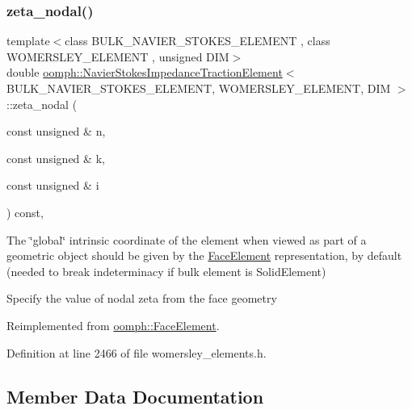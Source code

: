 \subsubsection{\texorpdfstring{zeta\+\_\+nodal()}{zeta\_nodal()}}
{\footnotesize\ttfamily template$<$class B\+U\+L\+K\+\_\+\+N\+A\+V\+I\+E\+R\+\_\+\+S\+T\+O\+K\+E\+S\+\_\+\+E\+L\+E\+M\+E\+NT , class W\+O\+M\+E\+R\+S\+L\+E\+Y\+\_\+\+E\+L\+E\+M\+E\+NT , unsigned D\+IM$>$ \\
double \hyperlink{classoomph_1_1NavierStokesImpedanceTractionElement}{oomph\+::\+Navier\+Stokes\+Impedance\+Traction\+Element}$<$ B\+U\+L\+K\+\_\+\+N\+A\+V\+I\+E\+R\+\_\+\+S\+T\+O\+K\+E\+S\+\_\+\+E\+L\+E\+M\+E\+NT, W\+O\+M\+E\+R\+S\+L\+E\+Y\+\_\+\+E\+L\+E\+M\+E\+NT, D\+IM $>$\+::zeta\+\_\+nodal (\begin{DoxyParamCaption}\item[{const unsigned \&}]{n,  }\item[{const unsigned \&}]{k,  }\item[{const unsigned \&}]{i }\end{DoxyParamCaption}) const\hspace{0.3cm}{\ttfamily [inline]}, {\ttfamily [virtual]}}



The \char`\"{}global\char`\"{} intrinsic coordinate of the element when viewed as part of a geometric object should be given by the \hyperlink{classoomph_1_1FaceElement}{Face\+Element} representation, by default (needed to break indeterminacy if bulk element is Solid\+Element) 

Specify the value of nodal zeta from the face geometry 

Reimplemented from \hyperlink{classoomph_1_1FaceElement_a58c9f93705c7741f76c8487d152e68a6}{oomph\+::\+Face\+Element}.



Definition at line 2466 of file womersley\+\_\+elements.\+h.



\subsection{Member Data Documentation}
\mbox{\label{classoomph_1_1NavierStokesImpedanceTractionElement_a15020b8235206fc52d2fcf967e471904}} 
